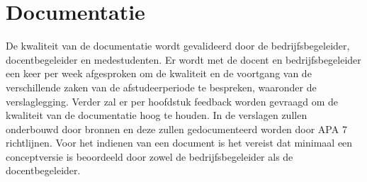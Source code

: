 \section{Documentatie}
De kwaliteit van de documentatie wordt gevalideerd door de bedrijfsbegeleider, docentbegeleider en medestudenten.
Er wordt met de docent en bedrijfsbegeleider een keer per week afgesproken om de kwaliteit en de voortgang van de verschillende zaken van de afstudeerperiode te bespreken, waaronder de verslaglegging.
Verder zal er per hoofdstuk feedback worden gevraagd om de kwaliteit van de documentatie hoog te houden.
In de verslagen zullen onderbouwd door bronnen en deze zullen gedocumenteerd worden door APA 7 richtlijnen.
Voor het indienen van een document is het vereist dat minimaal een conceptversie is beoordeeld door zowel de bedrijfsbegeleider als de docentbegeleider.
